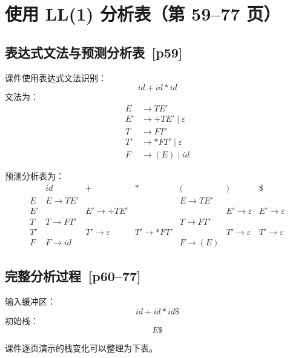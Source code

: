 \documentclass[UTF8,fontset=none,11pt]{ctexart}
\newcommand{\pg}[1]{\texorpdfstring{{\small\color{graytext}\,[p#1]}}{ [p#1]}}
\newcommand{\eps}{\varepsilon}
\begin{document}
\section{使用 LL(1) 分析表（第 59--77 页）}

\subsection{表达式文法与预测分析表 \pg{59}}
课件使用表达式文法识别：
\[
id+id*id
\]
文法为：
\[
\begin{aligned}
E&\to TE'\\
E'&\to +TE'\mid\eps\\
T&\to FT'\\
T'&\to *FT'\mid\eps\\
F&\to(E)\mid id
\end{aligned}
\]

预测分析表为：
\[
\begin{array}{c|cccccc}
 & id & + & * & ( & ) & \$\\
\hline
E & E\to TE' & & & E\to TE' & &\\
E'& & E'\to +TE' & & & E'\to\eps & E'\to\eps\\
T & T\to FT' & & & T\to FT' & &\\
T'& & T'\to\eps & T'\to *FT' & & T'\to\eps & T'\to\eps\\
F & F\to id & & & F\to(E) & &
\end{array}
\]

\subsection{完整分析过程 \pg{60--77}}
输入缓冲区：
\[
id+id*id\$
\]
初始栈：
\[
E\$
\]

课件逐页演示的栈变化可以整理为下表。
\end{document}
